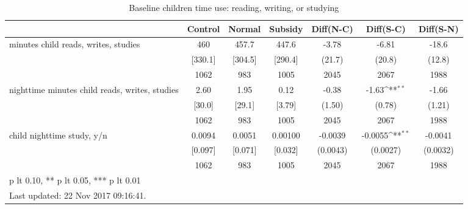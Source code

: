 \begin{table}[htbp]\centering
\def\sym#1{\ifmmode^{#1}\else\(^{#1}\)\fi}
\caption{Baseline children time use: reading, writing, or studying \label{tab:"balance"}}
\begin{tabular*}{1\hsize}{@{\hskip\tabcolsep\extracolsep\fill}l*{1}{cccccc}}
\toprule
                                &  Control&   Normal&  Subsidy&Diff(N-C)         &Diff(S-C)         &Diff(S-N)         \\
\midrule
minutes child reads, writes, studies&      460&    457.7&    447.6&    -3.78         &    -6.81         &    -18.6         \\
                                &  [330.1]&  [304.5]&  [290.4]&   (21.7)         &   (20.8)         &   (12.8)         \\
                                &     1062&      983&     1005&     2045         &     2067         &     1988         \\
nighttime minutes child reads, writes, studies&     2.60&     1.95&     0.12&    -0.38         &    -1.63\sym{**} &    -1.66         \\
                                &   [30.0]&   [29.1]&   [3.79]&   (1.50)         &   (0.78)         &   (1.21)         \\
                                &     1062&      983&     1005&     2045         &     2067         &     1988         \\
child nighttime study, y/n      &   0.0094&   0.0051&  0.00100&  -0.0039         &  -0.0055\sym{**} &  -0.0041         \\
                                &  [0.097]&  [0.071]&  [0.032]& (0.0043)         & (0.0027)         & (0.0032)         \\
                                &     1062&      983&     1005&     2045         &     2067         &     1988         \\
\bottomrule
\multicolumn{7}{l}{\footnotesize * p lt 0.10, ** p lt 0.05, *** p lt 0.01}\\
\multicolumn{7}{l}{\footnotesize Last updated: 22 Nov 2017 09:16:41.}\\
\end{tabular*}
\end{table}
